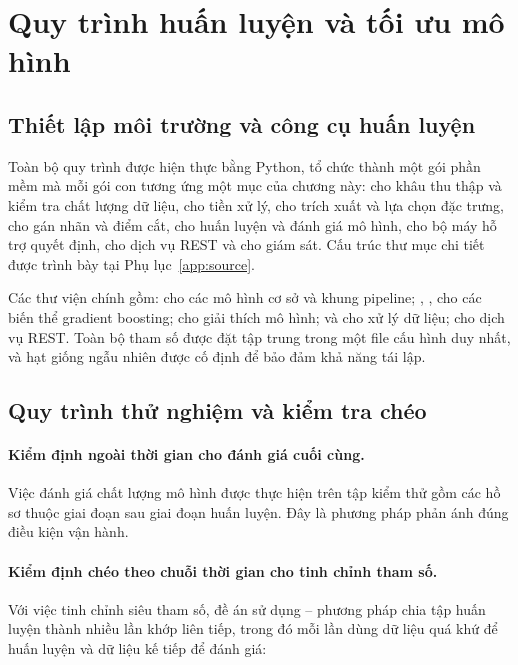 \section{Quy trình huấn luyện và tối ưu mô hình}
\label{sec:quy-trinh-huan-luyen}

\subsection{Thiết lập môi trường và công cụ huấn luyện}
\label{subsec:moi-truong-huan-luyen}

Toàn bộ quy trình được hiện thực bằng Python, tổ chức thành một gói phần mềm mà
mỗi gói con tương ứng một mục của chương này:  cho khâu thu thập và
kiểm tra chất lượng dữ liệu,  cho tiền xử lý, 
cho trích xuất và lựa chọn đặc trưng,  cho gán nhãn và điểm cắt,
 cho huấn luyện và đánh giá mô hình,  cho bộ máy hỗ
trợ quyết định,  cho dịch vụ REST và  cho giám
sát. Cấu trúc thư mục chi tiết được trình bày tại Phụ lục~\ref{app:source}.

Các thư viện chính gồm:  cho các mô hình cơ sở và khung
pipeline; , ,  cho các biến thể
gradient boosting;  cho giải thích mô hình;  và
 cho xử lý dữ liệu;  cho dịch vụ REST. Toàn bộ tham số
được đặt tập trung trong một file cấu hình duy nhất, và hạt giống ngẫu nhiên được
cố định để bảo đảm khả năng tái lập.

\subsection{Quy trình thử nghiệm và kiểm tra chéo}
\label{subsec:kiem-tra-cheo}

\paragraph{Kiểm định ngoài thời gian cho đánh giá cuối cùng.} Việc đánh giá chất
lượng mô hình được thực hiện trên tập kiểm thử gồm các hồ sơ thuộc giai đoạn sau
giai đoạn huấn luyện. Đây là phương pháp phản ánh đúng điều kiện vận hành.

\paragraph{Kiểm định chéo theo chuỗi thời gian cho tinh chỉnh tham số.} Với việc
tinh chỉnh siêu tham số, đề án sử dụng  -- phương pháp chia
tập huấn luyện thành nhiều lần khớp liên tiếp, trong đó mỗi lần dùng dữ liệu quá
khứ để huấn luyện và dữ liệu kế tiếp để đánh giá:

